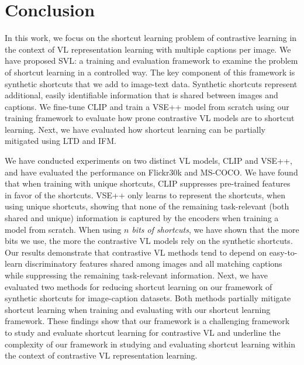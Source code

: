 
\section{Conclusion}
\label{sec:conclusion}

In this work, we focus on the shortcut learning problem of contrastive learning in the context of \acf{VL} representation learning with multiple captions per image.
We have proposed \acf{SVL}: a training and evaluation framework to examine the problem of shortcut learning in a controlled way. 
The key component of this framework is synthetic shortcuts that we add to image-text data. 
Synthetic shortcuts represent additional, easily identifiable information that is shared between images and captions.
We fine-tune CLIP and train a VSE++ model from scratch using our training framework to evaluate how prone contrastive \ac{VL} models are to shortcut learning.
Next, we have evaluated how shortcut learning can be partially mitigated using \acl{LTD} and \acl{IFM}.

 We have conducted experiments on two distinct \ac{VL} models, CLIP and VSE++, and have evaluated the performance on \ac{Flickr30k} and \ac{MS-COCO}.
We have found that when training with unique shortcuts, CLIP suppresses pre-trained features in favor of the shortcuts.
	VSE++ only learns to represent the shortcuts, when using unique shortcuts, showing that none of the remaining task-relevant (both shared and unique) information is captured by the encoders when training a model from scratch.
	When using \textit{$n$ bits of shortcuts}, we have shown that the more bits we use, the more the contrastive \ac{VL} models rely on the synthetic shortcuts.
	Our results demonstrate that contrastive \ac{VL} methods tend to depend on easy-to-learn discriminatory features shared among images and all matching captions while suppressing the remaining task-relevant information. 
	Next, we have evaluated two methods for reducing shortcut learning on our framework of synthetic shortcuts for image-caption datasets.
	Both methods partially mitigate shortcut learning when training and evaluating with our shortcut learning framework.
	These findings show that our framework is a challenging framework to study and evaluate shortcut learning for contrastive \ac{VL} and underline the complexity of our framework in studying and evaluating shortcut learning within the context of contrastive \ac{VL} representation learning.

